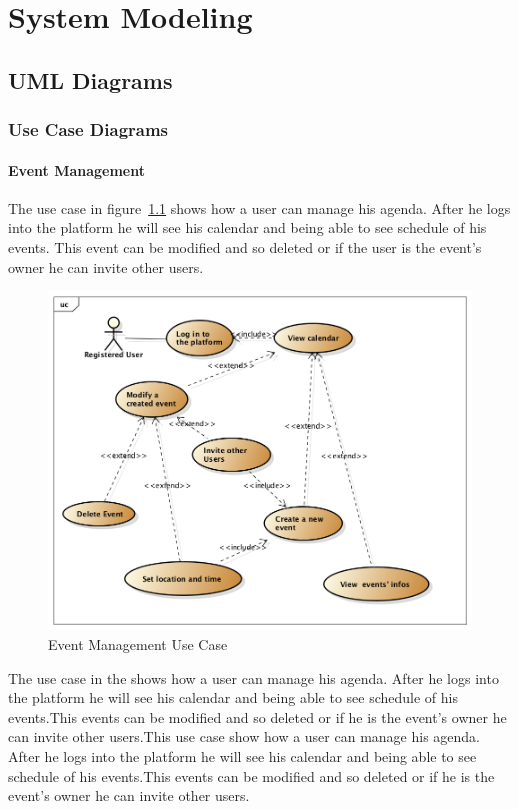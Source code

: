 \chapter{System Modeling} \label{cap:cap4}
\section{UML Diagrams}
\subsection{Use Case Diagrams}
\subsubsection{Event Management}
The use case in figure~\ref{fig:eventusecase} shows how a user can manage his agenda. After he logs into the platform he will see his calendar and being able to see schedule of his events. This event can be modified and so deleted or if the user is the event's owner he can invite other users.
 \begin{center}
 \begin{figure}[H]
    \includegraphics[width=1\textwidth]{../UMLDiagram/use_case/EventManagmentUseCase/EventManagment.png}
    \caption{Event Management Use Case}
     \label{fig:eventusecase}
     \end{figure}
   \end{center}  
The use case in the shows how a user can manage his agenda. After he logs into the platform he will see his calendar and being able to see schedule of his events.This events can be modified and so deleted or if he is the event's owner he can invite other users.This use case show how a user can manage his agenda. After he logs into the platform he will see his calendar and being able to see schedule of his events.This events can be modified and so deleted or if he is the event's owner he can invite other users.
